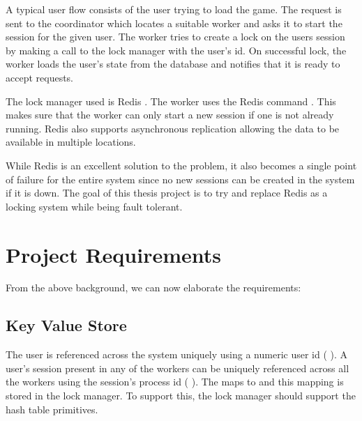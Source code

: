 A typical user flow consists of the user trying to load the game. The request
is sent to the coordinator which locates a suitable worker and asks it to
start the session for the given user. The worker tries to create a lock on
the users session by making a call to the lock manager with the user's id.
On successful lock, the worker loads the user's state from the database and
notifies that it is ready to accept requests.

The lock manager used is Redis \citep{redis}%
. The worker uses the Redis command %
. This makes sure that the worker can only start a new session if one is
not already running. Redis also supports asynchronous replication allowing the
data to be available in multiple locations.

While Redis is an excellent solution to the problem, it also becomes a single
point of failure for the entire system since no new sessions can be created in
the system if it is down. The goal of this thesis project is to try and replace
Redis as a locking system while being fault tolerant.

\section{Project Requirements}

From the above background, we can now elaborate the requirements:

\subsection{Key Value Store}
\label{section:ml.kv.store}


The user is referenced across the system uniquely using a numeric user id
(%
). A user's session present in any of the workers can be uniquely
referenced across all the workers using the session's process id
(%
).
The  maps to  and this mapping is stored in the lock
manager. To support this, the lock manager should support the hash
table primitives.

